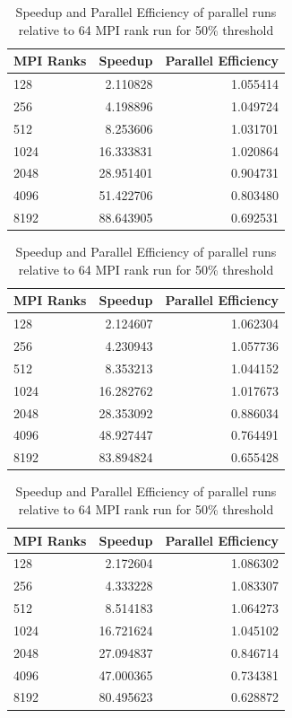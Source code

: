 \documentclass[11pt]{article}
\numberwithin{figure}{section}
\begin{document}
\begin{center}
\begin{table}[h]
\begin{tabular}{| l | r | r | }
\hline
MPI Ranks & Speedup & Parallel Efficiency \\ \hline
128 & 2.110828 & 1.055414 \\ \hline
256 & 4.198896 & 1.049724 \\ \hline
512 & 8.253606 & 1.031701 \\ \hline
1024 & 16.333831 & 1.020864 \\ \hline
2048 & 28.951401 & 0.904731 \\ \hline
4096 & 51.422706 & 0.803480 \\ \hline
8192 & 88.643905 & 0.692531 \\ \hline
\end{tabular}
\caption{Speedup and Parallel Efficiency of parallel runs relative to 64 MPI rank run for 0\% threshold}
\label{speedup1}

\begin{tabular}{| l | r | r | }
\hline
MPI Ranks & Speedup & Parallel Efficiency \\ \hline
128 & 2.124607 & 1.062304 \\ \hline
256 & 4.230943 & 1.057736 \\ \hline
512 & 8.353213 & 1.044152 \\ \hline
1024 & 16.282762 & 1.017673 \\ \hline
2048 & 28.353092 & 0.886034 \\ \hline
4096 & 48.927447 & 0.764491 \\ \hline
8192 & 83.894824 & 0.655428 \\ \hline
\end{tabular}
\caption{Speedup and Parallel Efficiency of parallel runs relative to 64 MPI rank run for 25\% threshold}

\begin{tabular}{| l | r | r | }
\hline
MPI Ranks & Speedup & Parallel Efficiency \\ \hline
128 & 2.172604 & 1.086302 \\ \hline
256 & 4.333228 & 1.083307 \\ \hline
512 & 8.514183 & 1.064273 \\ \hline
1024 & 16.721624 & 1.045102 \\ \hline
2048 & 27.094837 & 0.846714 \\ \hline
4096 & 47.000365 & 0.734381 \\ \hline
8192 & 80.495623 & 0.628872 \\ \hline
\end{tabular}
\caption{Speedup and Parallel Efficiency of parallel runs relative to 64 MPI rank run for 50\% threshold}


\end{table}
\end{center}
\end{document}
